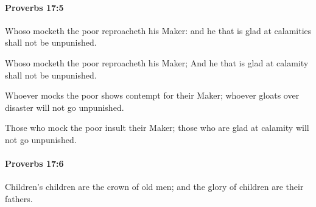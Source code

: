 		\paragraph{Proverbs 17:5} %
			\label{PROVERBS-17-5}

			Whoso mocketh the poor reproacheth his Maker: and he that is glad at calamities shall not be unpunished.

			\begin{versebox}
					\item[BHS] 
					\item[ASV] Whoso mocketh the poor reproacheth his Maker; And he that is glad at calamity shall not be unpunished.
					\item[NIV] Whoever mocks the poor shows contempt for their Maker; whoever gloats over disaster will not go unpunished.
					\item[NRSV] Those who mock the poor insult their Maker; those who are glad at calamity will not go unpunished.
			\end{versebox}

		\paragraph{Proverbs 17:6} %
			\label{PROVERBS-17-6}

			Children’s children are the crown of old men; and the glory of children are their fathers.

